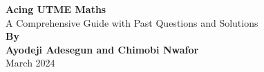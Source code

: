 \documentclass[a4paper]{book}
\begin{document}
\begin{titlingpage}
\centering
\vspace*{\fill}
\Huge\textbf{Acing UTME Maths}\\
\vspace{1cm}
\Large{A Comprehensive Guide with Past Questions and Solutions}\\
\vspace{2cm}
\Large\textbf{By}\\
\vspace{0.5cm}
\Large\textbf{Ayodeji Adesegun and Chimobi Nwafor}\\
\vspace{\fill}
\Large{March 2024}\\
\vspace*{\fill}
\end{titlingpage}
\end{document}
